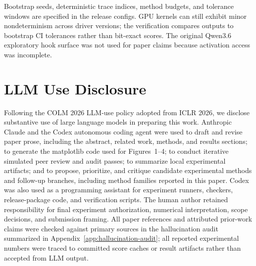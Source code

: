 \documentclass{article}
\begin{document}
\begin{table}[h]
\centering
\small
{}
\caption{Model checkpoints used by the experiments. Full provenance and file-level hashes are recorded in the archived result manifests; the release package records claim-to-script tolerance mappings.}
\end{table}

Bootstrap seeds, deterministic trace indices, method budgets, and tolerance windows are specified in the release configs. GPU kernels can still exhibit minor nondeterminism across driver versions; the verification compares outputs to bootstrap CI tolerances rather than bit-exact scores. The original Qwen3.6 exploratory hook surface was not used for paper claims because activation access was incomplete.

\section*{LLM Use Disclosure}
Following the COLM 2026 LLM-use policy adopted from ICLR 2026, we disclose substantive use of large language models in preparing this work. Anthropic Claude and the Codex autonomous coding agent were used to draft and revise paper prose, including the abstract, related work, methods, and results sections; to generate the matplotlib code used for Figures~1--4; to conduct iterative simulated peer review and audit passes; to summarize local experimental artifacts; and to propose, prioritize, and critique candidate experimental methods and follow-up branches, including method families reported in this paper. Codex was also used as a programming assistant for experiment runners, checkers, release-package code, and verification scripts. The human author retained responsibility for final experiment authorization, numerical interpretation, scope decisions, and submission framing. All paper references and attributed prior-work claims were checked against primary sources in the hallucination audit summarized in Appendix~\ref{app:hallucination-audit}; all reported experimental numbers were traced to committed score caches or result artifacts rather than accepted from LLM output.
\end{document}
